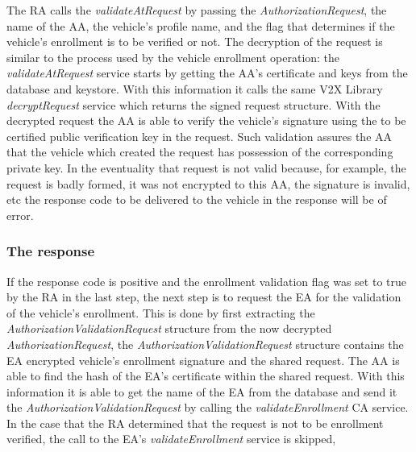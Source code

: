 The RA calls the \textit{validateAtRequest} by passing the \textit{AuthorizationRequest}, the name of the AA, the vehicle's profile name, and the flag that determines if the vehicle's enrollment is to be verified or not. The decryption of the request is similar to the process used by the vehicle enrollment operation: the \textit{validateAtRequest} service starts by getting the AA's certificate and keys from the database and keystore. With this information it calls the same V2X Library \textit{decryptRequest} service which returns the signed request structure. With the decrypted request the AA is able to verify the vehicle's signature using the to be certified public verification key in the request. Such validation assures the AA that the vehicle which created the request has possession of the corresponding private key. In the eventuality that request is not valid because, for example, the request is badly formed, it was not encrypted to this AA, the signature is invalid, etc the response code to be delivered to the vehicle in the response will be of error.

\subsubsection{The response}
If the response code is positive and the enrollment validation flag was set to true by the RA in the last step, the next step is to request the EA for the validation of the vehicle's enrollment. This is done by first extracting the \textit{AuthorizationValidationRequest} structure from the now decrypted \textit{AuthorizationRequest}, the \textit{AuthorizationValidationRequest} structure contains the EA encrypted vehicle's enrollment signature and the shared request. The AA is able to find the hash of the EA's certificate within the shared request. With this information it is able to get the name of the EA from the database and send it the \textit{AuthorizationValidationRequest} by calling the \textit{validateEnrollment} CA service. In the case that the RA determined that the request is not to be enrollment verified, the call to the EA's \textit{validateEnrollment} service is skipped, 


